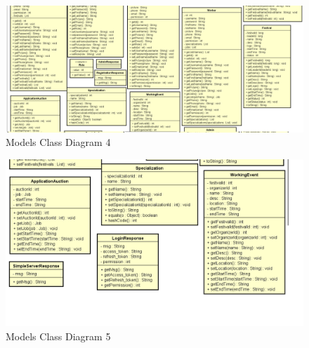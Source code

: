 		\begin{figure}[H]
			\includegraphics[width=\linewidth]{diagrams/Models Class Diagram_4.png}
			\caption{Models Class Diagram 4}
			\label{fig:models_class_diag_4}
		\end{figure}
	
		\begin{figure}[H]
			\includegraphics[width=\linewidth]{diagrams/Models Class Diagram_5.png}
			\caption{Models Class Diagram 5}
			\label{fig:models_class_diag_5}
		\end{figure}
	
